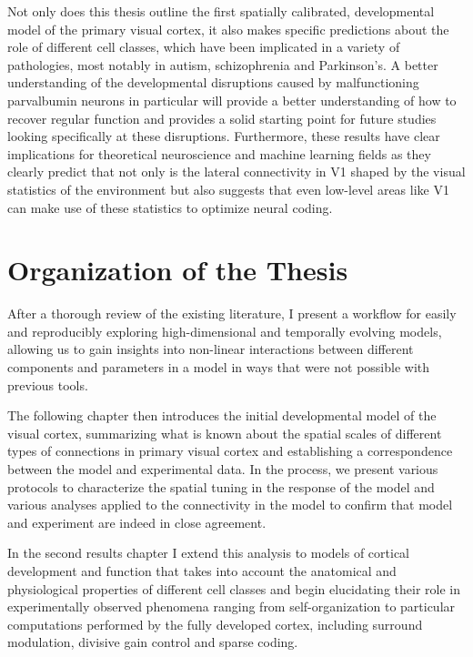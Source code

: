 Not only does this thesis outline the first spatially calibrated,
developmental model of the primary visual cortex, it also makes specific
predictions about the role of different cell classes, which have been
implicated in a variety of pathologies, most notably in autism,
schizophrenia and Parkinson's. A better understanding of the
developmental disruptions caused by malfunctioning parvalbumin neurons
in particular will provide a better understanding of how to recover
regular function and provides a solid starting point for future
studies looking specifically at these disruptions. Furthermore, these
results have clear implications for theoretical neuroscience and
machine learning fields as they clearly predict that not only is the
lateral connectivity in V1 shaped by the visual statistics of the
environment but also suggests that even low-level areas like V1 can
make use of these statistics to optimize neural coding.

\section{Organization of the Thesis}

After a thorough review of the existing literature, I present a
workflow for easily and reproducibly exploring high-dimensional and
temporally evolving models, allowing us to gain insights into
non-linear interactions between different components and parameters in
a model in ways that were not possible with previous tools.

The following chapter then introduces the initial developmental model
of the visual cortex, summarizing what is known about the spatial scales
of different types of connections in primary visual cortex and
establishing a correspondence between the model and experimental data. In
the process, we present various protocols to characterize the spatial
tuning in the response of the model and various analyses applied to
the connectivity in the model to confirm that model and experiment are
indeed in close agreement.

In the second results chapter I extend this analysis to models of
cortical development and function that takes into account the
anatomical and physiological properties of different cell classes and
begin elucidating their role in experimentally observed phenomena
ranging from self-organization to particular computations performed by
the fully developed cortex, including surround modulation, divisive
gain control and sparse coding.

